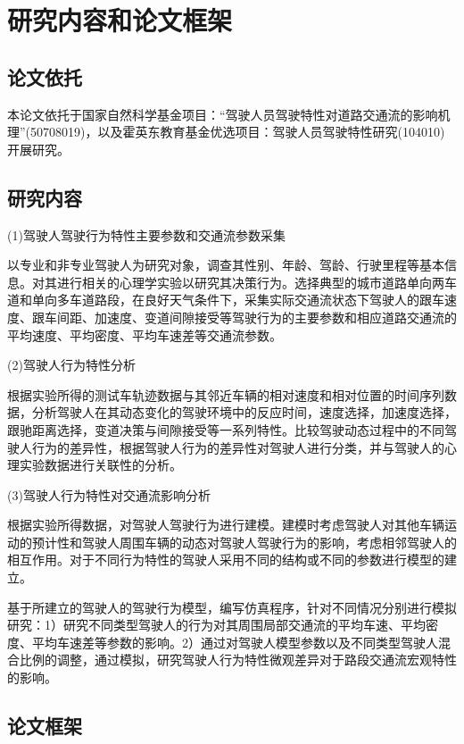 \section{研究内容和论文框架}

\subsection{论文依托}

本论文依托于国家自然科学基金项目：“驾驶人员驾驶特性对道路交通流的影响机理”(50708019)，以及霍英东教育基金优选项目：驾驶人员驾驶特性研究(104010)开展研究。

\subsection{研究内容}
(1)驾驶人驾驶行为特性主要参数和交通流参数采集

以专业和非专业驾驶人为研究对象，调查其性别、年龄、驾龄、行驶里程等基本信息。对其进行相关的心理学实验以研究其决策行为。选择典型的城市道路单向两车道和单向多车道路段，在良好天气条件下，采集实际交通流状态下驾驶人的跟车速度、跟车间距、加速度、变道间隙接受等驾驶行为的主要参数和相应道路交通流的平均速度、平均密度、平均车速差等交通流参数。

(2)驾驶人行为特性分析

根据实验所得的测试车轨迹数据与其邻近车辆的相对速度和相对位置的时间序列数据，分析驾驶人在其动态变化的驾驶环境中的反应时间，速度选择，加速度选择，跟驰距离选择，变道决策与间隙接受等一系列特性。比较驾驶动态过程中的不同驾驶人行为的差异性，根据驾驶人行为的差异性对驾驶人进行分类，并与驾驶人的心理实验数据进行关联性的分析。

(3)驾驶人行为特性对交通流影响分析

根据实验所得数据，对驾驶人驾驶行为进行建模。建模时考虑驾驶人对其他车辆运动的预计性和驾驶人周围车辆的动态对驾驶人驾驶行为的影响，考虑相邻驾驶人的相互作用。对于不同行为特性的驾驶人采用不同的结构或不同的参数进行模型的建立。

基于所建立的驾驶人的驾驶行为模型，编写仿真程序，针对不同情况分别进行模拟研究：1）研究不同类型驾驶人的行为对其周围局部交通流的平均车速、平均密度、平均车速差等参数的影响。2）通过对驾驶人模型参数以及不同类型驾驶人混合比例的调整，通过模拟，研究驾驶人行为特性微观差异对于路段交通流宏观特性的影响。




\subsection{论文框架}


